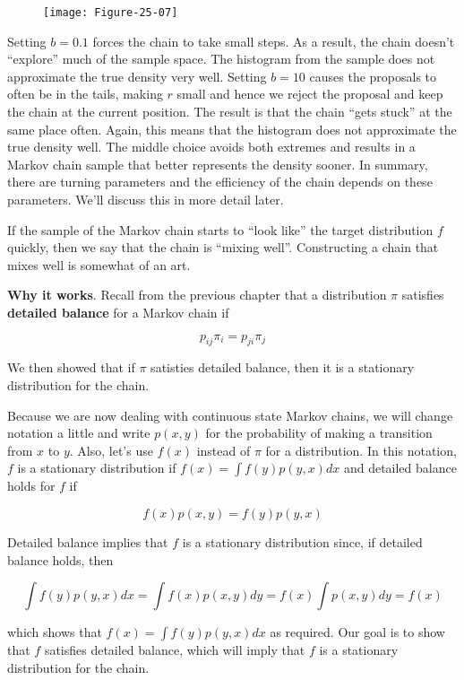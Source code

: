 \begin{figure}[H]
\texttt{[image: Figure-25-07]}
\end{figure}

Setting \(b = 0.1\) forces the chain to take small steps. As a result,
the chain doesn't ``explore'' much of the sample space. The histogram
from the sample does not approximate the true density very well. Setting
\(b = 10\) causes the proposals to often be in the tails, making \(r\)
small and hence we reject the proposal and keep the chain at the current
position. The result is that the chain ``gets stuck'' at the same place
often. Again, this means that the histogram does not approximate the
true density well. The middle choice avoids both extremes and results in
a Markov chain sample that better represents the density sooner. In
summary, there are turning parameters and the efficiency of the chain
depends on these parameters. We'll discuss this in more detail later.

If the sample of the Markov chain starts to ``look like'' the target
distribution \(f\) quickly, then we say that the chain is ``mixing
well''. Constructing a chain that mixes well is somewhat of an art.

\textbf{Why it works}. Recall from the previous chapter that a
distribution \(\pi\) satisfies \textbf{detailed balance} for a Markov
chain if

\[ p_{ij} \pi_i = p_{ji} \pi_j \]

We then showed that if \(\pi\) satisties detailed balance, then it is a
stationary distribution for the chain.

Because we are now dealing with continuous state Markov chains, we will
change notation a little and write \(p(x, y)\) for the probability of
making a transition from \(x\) to \(y\). Also, let's use \(f(x)\)
instead of \(\pi\) for a distribution. In this notation, \(f\) is a
stationary distribution if \(f(x) = \int f(y) p(y, x) dx\) and detailed
balance holds for \(f\) if

\[ f(x) p(x, y) = f(y) p(y, x) \]

Detailed balance implies that \(f\) is a stationary distribution since,
if detailed balance holds, then

\[ \int f(y) p(y, x) dx = \int f(x) p(x, y) dy = f(x) \int p(x, y) dy = f(x) \]

which shows that \(f(x) = \int f(y) p(y, x) dx\) as required. Our goal
is to show that \(f\) satisfies detailed balance, which will imply that
\(f\) is a stationary distribution for the chain.

